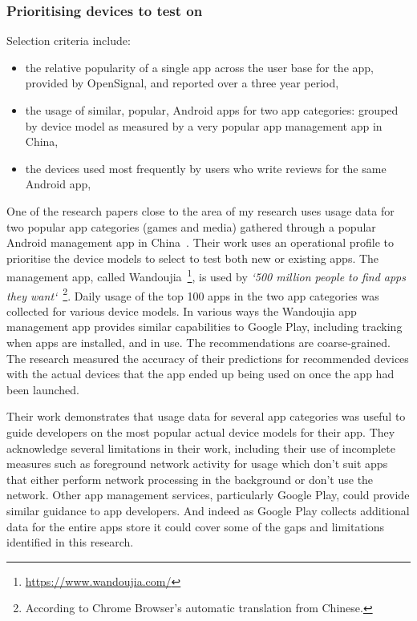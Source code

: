 \subsubsection{Prioritising devices to test on}

Selection criteria include:
\begin{itemize}
    \item the relative popularity of a single app across the user base for the app, provided by OpenSignal, and reported over a three year period,
    \item the usage of similar, popular, Android apps for two app categories: grouped by device model as measured by a very popular app management app in China,
    \item the devices used most frequently by users who write reviews for the same Android app,
\end{itemize}

One of the research papers close to the area of my research uses usage data for two popular app categories (games and media) gathered through a popular Android management app in China~\citep{lu2016_PRADA}. Their work uses an operational profile to prioritise the device models to select to test both new or existing apps. The management app, called Wandoujia~\footnote{\url{https://www.wandoujia.com/}}, is used by \emph{`500 million people to find apps they want`}~\footnote{According to Chrome Browser's automatic translation from Chinese.}. Daily usage of the top 100 apps in the two app categories was collected for various device models. In various ways the Wandoujia app management app provides similar capabilities to Google Play, including tracking when apps are installed, and in use. The recommendations are coarse-grained. The research measured the accuracy of their predictions for recommended devices with the actual devices that the app ended up being used on once the app had been launched. 

Their work demonstrates that usage data for several app categories was useful to guide developers on the most popular actual device models for their app. They acknowledge several limitations in their work, including their use of incomplete measures such as foreground network activity for usage which don't suit apps that either perform network processing in the background or don't use the network. Other app management services, particularly Google Play, could provide similar guidance to app developers. And indeed as Google Play collects additional data for the entire apps store it could cover some of the gaps and limitations identified in this research.


